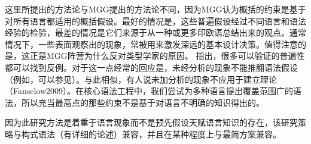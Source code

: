 这里所提出的方法论与MGG提出的方法论不同，因为MGG认为概括的约束是基于对所有语言都适用的概括假设。最好的情况是，这些普遍假设经过不同语言和语法经验的检验，最差的情况是它们来源于从一种或更多印欧语总结出来的观点。通常情况下，一些表面观察出的现象，常被用来激发深远的基本设计决策\citep{Fanselow2009a,SR2012a,Haider2016a}。值得注意的是，这正是MGG阵营为什么反对类型学家的原因。 \citet{EL2009a}指出，很多可以验证的普遍性都可以找到反例。对于这一点经常的回应是，未经分析的现象不能推翻语法假设（例如，可以参见\citet[]{Freidin2009a}）。与此相似，有人说未加分析的现象不应用于建立理论（Fanselow2009）。在核心语法工程中，我们尝试为多种语言提出覆盖范围广的语法，所以充当最高点的那些约束不是基于对语言不明确的知识得出的。

因为此研究方法是着重于语言现象而不是预先假设天赋语言知识的存在，该研究策略与构式语法（\citet[]{Goldberg2013b}有详细的论述）兼容，并且在某种程度上与最简方案兼容。


